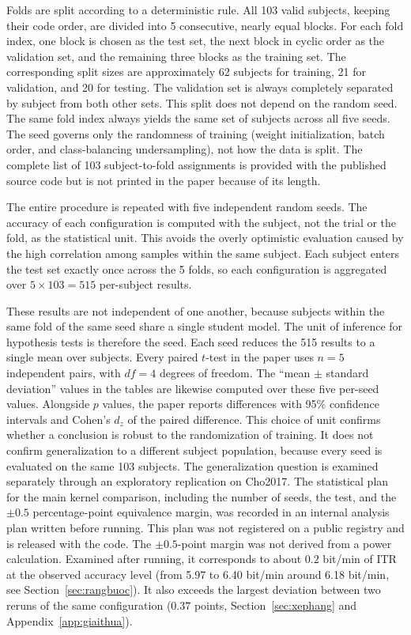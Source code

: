 Folds are split according to a deterministic rule. All 103 valid
subjects, keeping their code order, are divided into 5 consecutive,
nearly equal blocks. For each fold index, one block is chosen as the
test set, the next block in cyclic order as the validation set, and
the remaining three blocks as the training set. The corresponding split
sizes are approximately 62 subjects for training, 21 for
validation, and 20 for testing. The validation set is always completely
separated by subject from both other sets. This split does not
depend on the random seed. The same fold index always yields the
same set of subjects across all five seeds. The seed governs only the randomness of training (weight initialization,
batch order, and class-balancing undersampling), not how the data is
split. The complete list of 103 subject-to-fold
assignments is provided with the published source code but is not
printed in the paper because of its length.

The entire procedure is repeated with five independent random seeds.
The accuracy of each configuration is computed with the subject, not the
trial or the fold, as the statistical unit. This avoids the overly
optimistic evaluation caused by the high correlation among samples within
the same subject. Each subject enters the test
set exactly once across the 5 folds, so each configuration is
aggregated over $5 \times 103 = 515$ per-subject results.

These results are not independent of one another, because subjects
within the same fold of the same seed share a single student model.
The unit of inference for hypothesis tests is therefore the seed. Each
seed reduces the 515 results to a single mean over subjects. Every
paired $t$-test in the paper uses $n = 5$ independent pairs, with
$df = 4$ degrees of freedom. The ``mean $\pm$ standard deviation''
values in the tables are likewise computed over these five per-seed
values. Alongside $p$ values, the paper reports differences with 95\%
confidence intervals and Cohen's $d_z$ of the paired difference. This
choice of unit confirms whether a conclusion is robust to the
randomization of training. It does not confirm generalization to a
different subject population, because every seed is evaluated on the
same 103 subjects. The generalization question is examined separately
through an exploratory replication on Cho2017. The statistical plan
for the main kernel comparison, including the number of seeds, the
test, and the $\pm 0.5$ percentage-point equivalence margin, was
recorded in an internal analysis plan written before running. This plan
was not registered on a public registry and is released with the code.
The $\pm 0.5$-point margin was not derived from a power calculation.
Examined after running, it corresponds to about $0.2$ bit/min of ITR at
the observed accuracy level (from 5.97 to 6.40 bit/min around 6.18
bit/min, see Section~\ref{sec:rangbuoc}). It also exceeds the largest deviation between two reruns of the same configuration ($0.37$ points,
Section~\ref{sec:xephang} and Appendix~\ref{app:giaithua}).


